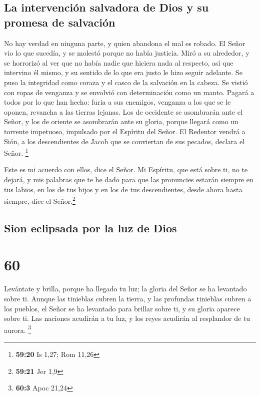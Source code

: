 \hypertarget{la-intervenciuxf3n-salvadora-de-dios-y-su-promesa-de-salvaciuxf3n}{%
\subsection{La intervención salvadora de Dios y su promesa de
salvación}\label{la-intervenciuxf3n-salvadora-de-dios-y-su-promesa-de-salvaciuxf3n}}

 No hay verdad en ninguna parte, y quien abandona el mal
es robado. El Señor vio lo que sucedía, y se molestó porque no había
justicia.  Miró a su alrededor, y se horrorizó al ver que
no había nadie que hiciera nada al respecto, así que intervino él mismo,
y su sentido de lo que era justo le hizo seguir adelante.
 Se puso la integridad como coraza y el casco de la
salvación en la cabeza. Se vistió con ropas de venganza y se envolvió
con determinación como un manto.  Pagará a todos por lo
que han hecho: furia a sus enemigos, venganza a los que se le oponen,
revancha a las tierras lejanas.  Los de occidente se
asombrarán ante el Señor, y los de oriente se asombrarán ante su gloria,
porque llegará como un torrente impetuoso, impulsado por el Espíritu del
Señor.  El Redentor vendrá a Sión, a los descendientes de
Jacob que se conviertan de sus pecados, declara el Señor. \footnote{\textbf{59:20}
  Is 1,27; Rom 11,26}

 Este es mi acuerdo con ellos, dice el Señor. Mi
Espíritu, que está sobre ti, no te dejará, y mis palabras que te he dado
para que las pronuncies estarán siempre en tus labios, en los de tus
hijos y en los de tus descendientes, desde ahora hasta siempre, dice el
Señor.\footnote{\textbf{59:21} Jer 1,9}

\hypertarget{sion-eclipsada-por-la-luz-de-dios}{%
\subsection{Sion eclipsada por la luz de
Dios}\label{sion-eclipsada-por-la-luz-de-dios}}

\hypertarget{section-59}{%
\section{60}\label{section-59}}

 Levántate y brilla, porque ha llegado tu luz; la gloria
del Señor se ha levantado sobre ti.  Aunque las tinieblas
cubren la tierra, y las profundas tinieblas cubren a los pueblos, el
Señor se ha levantado para brillar sobre ti, y su gloria aparece sobre
ti.  Las naciones acudirán a tu luz, y los reyes acudirán
al resplandor de tu aurora. \footnote{\textbf{60:3} Apoc 21,24}

